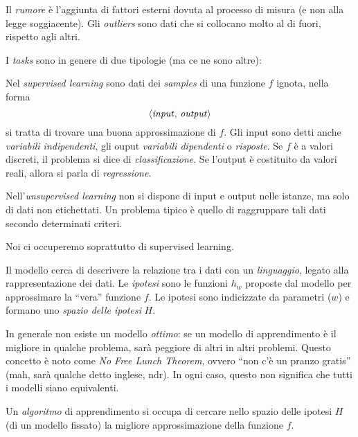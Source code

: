 \begin{definition}
Il \emph{rumore} è l'aggiunta di fattori esterni dovuta al processo di misura (e non alla legge soggiacente). Gli \emph{outliers} sono dati che si collocano molto al di fuori, rispetto agli altri.
\end{definition}

I \emph{tasks} sono in genere di due tipologie (ma ce ne sono altre):

\begin{definition}
Nel \emph{supervised learning} sono dati dei \emph{samples} di una funzione $f$ ignota, nella forma \[\langle\text{\emph{input}},\,\text{\emph{output}}\rangle\] si tratta di trovare una buona approssimazione di $f$. Gli input sono detti anche \emph{variabili indipendenti}, gli ouput \emph{variabili dipendenti} o \emph{risposte}. Se $f$ è a valori discreti, il problema si dice di \emph{classificazione}. Se l'output è costituito da valori reali, allora si parla di \emph{regressione}.
\end{definition}

\begin{definition}
Nell'\emph{unsupervised learning} non si dispone di input e output nelle istanze, ma solo di dati non etichettati. Un problema tipico è quello di raggruppare tali dati secondo determinati criteri.
\end{definition}

Noi ci occuperemo soprattutto di supervised learning.

\begin{definition}
Il modello cerca di descrivere la relazione tra i dati con un \emph{linguaggio}, legato alla rappresentazione dei dati. Le \emph{ipotesi} sono le funzioni $h_w$ proposte dal modello per approssimare la “vera” funzione $f$. Le ipotesi sono indicizzate da parametri ($w$) e formano uno \emph{spazio delle ipotesi} $H$.
\end{definition}

In generale non esiste un modello \emph{ottimo}: se un modello di apprendimento è il migliore in qualche problema, sarà peggiore di altri in altri problemi. Questo concetto è noto come \emph{No Free Lunch Theorem}, ovvero “non c'è un pranzo gratis” (mah, sarà qualche detto inglese, ndr). In ogni caso, questo non significa che tutti i modelli siano equivalenti.

\begin{definition}
Un \emph{algoritmo} di apprendimento si occupa di cercare nello spazio delle ipotesi $H$ (di un modello fissato) la migliore approssimazione della funzione $f$.
\end{definition}


